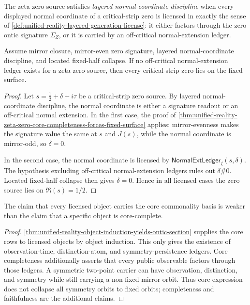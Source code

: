 \begin{definition}
\label{def:unified-reality-layered-normal-coordinate-discipline}
The zeta zero source satisfies \emph{layered normal-coordinate
discipline} when every displayed normal coordinate of a critical-strip
zero is licensed in exactly the sense of
\autoref{def:unified-reality-layered-generation-license}: it either
factors through the zero ontic signature $\Sigma_Z$, or it is carried by
an off-critical normal-extension ledger.
\end{definition}

\begin{theorem}
\label{thm:unified-reality-no-normal-extension-gives-fixed-surface}
Assume mirror closure, mirror-even zero signature, layered
normal-coordinate discipline, and located fixed-half collapse.  If no
off-critical normal-extension ledger exists for a zeta zero source, then
every critical-strip zero lies on the fixed surface.
\end{theorem}

\begin{proof}
Let $s=\frac12+\delta+i\tau$ be a critical-strip zero source.  By
layered normal-coordinate discipline, the normal coordinate is either a
signature readout or an off-critical normal extension.  In the first
case, the proof of
\autoref{thm:unified-reality-zeta-zero-core-completeness-forces-fixed-surface}
applies: mirror-evenness makes the signature value the same at $s$ and
$J(s)$, while the normal coordinate is mirror-odd, so $\delta=0$.

In the second case, the normal coordinate is licensed by
$\mathsf{NormalExtLedger}_{\zeta}(s,\delta)$.  The hypothesis excluding
off-critical normal-extension ledgers rules out $\delta\#0$.  Located
fixed-half collapse then gives $\delta=0$.  Hence in all licensed cases
the zero source lies on $\Re(s)=1/2$.
\end{proof}

\begin{theorem}
\label{thm:unified-reality-core-expression-distinct-from-completeness}
The claim that every licensed object carries the core commonality basis
is weaker than the claim that a specific object is core-complete.
\end{theorem}

\begin{proof}
\autoref{thm:unified-reality-object-induction-yields-ontic-section}
supplies the core rows to licensed objects by object induction.  This
only gives the existence of observation-time, distinction-atom, and
symmetry-persistence ledgers.  Core completeness additionally asserts
that every public observable factors through those ledgers.  A symmetric
two-point carrier can have observation, distinction, and symmetry while
still carrying a non-fixed mirror orbit.  Thus core expression does not
collapse all symmetry orbits to fixed orbits; completeness and
faithfulness are the additional claims.
\end{proof}

